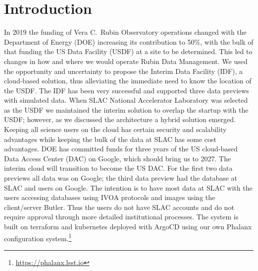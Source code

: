 \section{Introduction}
In 2019 the funding of Vera C.\ Rubin Observatory \cite{2019ApJ...873..111I} operations changed with the Department of Energy (DOE) increasing its contribution to 50\%, with the bulk of that funding the US Data Facility (USDF) at a site to be determined.
This led to changes in how and where we would operate Rubin Data Management.
We used the opportunity and uncertainty to propose the Interim Data Facility (IDF), a cloud-based solution, thus alleviating the immediate need to know the location of the USDF.
The IDF has been very successful and supported three data previews with simulated data.\cite{2021arXiv211115030O}
When SLAC National Accelerator Laboratory was selected as the USDF we maintained the interim solution to overlap the startup with the USDF; however, as we discussed the architecture a hybrid solution emerged.
Keeping all science users on the cloud has certain security and scalability advantages while keeping the bulk of the data at SLAC has some cost advantages.
DOE has committed funds for three years of the US cloud-based Data Access Center (DAC) on Google, which should bring us to 2027.
The interim cloud will transition to become the US DAC.
For the first two data previews all data was on Google; the third data preview had the database at SLAC and users on Google.
The intention is to have most data at SLAC with the users accessing databases using IVOA protocols and images using the client/server Butler.\cite{2024SPIE13101.129Jtmp}
Thus the users do not have SLAC accounts and do not require approval through more detailed institutional processes.
The system is built on terraform and kubernetes deployed with ArgoCD using our own Phalanx configuration system.\footnote{\url{https://phalanx.lsst.io}}










